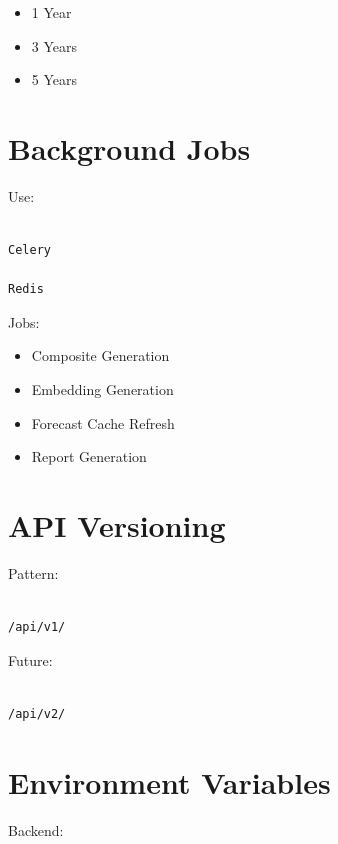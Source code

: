 \documentclass[11pt,a4paper]{article}
\begin{document}
\begin{itemize}
\item 1 Year
\item 3 Years
\item 5 Years
\end{itemize}

\section{Background Jobs}

Use:

\begin{verbatim}

Celery

Redis

\end{verbatim}

Jobs:

\begin{itemize}
\item Composite Generation
\item Embedding Generation
\item Forecast Cache Refresh
\item Report Generation
\end{itemize}

\section{API Versioning}

Pattern:

\begin{verbatim}

/api/v1/

\end{verbatim}

Future:

\begin{verbatim}

/api/v2/

\end{verbatim}

\section{Environment Variables}

Backend:
\end{document}
